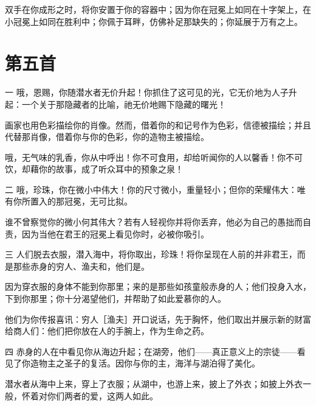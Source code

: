 双手在你成形之时，将你安置于你的容器中；因为你在冠冕上如同在十字架上，在小冠冕上如同在胜利中；你佩于耳畔，仿佛补足那缺失的；你延展于万有之上。\par


\section{第五首}

一 哦，恩赐，你随潜水者无价升起！你抓住了这可见的光，它无价地为人子升起：一个关于那隐藏者的比喻，祂无价地赐下隐藏的曙光！\par

画家也用色彩描绘你的肖像。然而，借着你的和记号作为色彩，信德被描绘；并且代替那肖像，借着你与你的色彩，你的造物主被描绘。\par

哦，无气味的乳香，你从中呼出！你不可食用，却给听闻你的人以馨香！你不可饮，却藉你的故事，成了听众耳中的预象之泉！\par

二 哦，珍珠，你在微小中伟大！你的尺寸微小，重量轻小；但你的荣耀伟大：唯有你所置入的那冠冕，无可比拟。\par

谁不曾察觉你的微小何其伟大？若有人轻视你并将你丢弃，他必为自己的愚拙而自责，因为当他在君王的冠冕上看见你时，必被你吸引。\par

三 人们脱去衣服，潜入海中，将你取出，珍珠！将你呈现在人前的并非君王，而是那些赤身的穷人、渔夫和，他们是。\par

因为穿衣服的身体不能到你那里；来的是那些如孩童般赤身的人；他们投身入水，下到你那里；你十分渴望他们，并帮助了如此爱慕你的人。\par

他们为你传报喜讯：穷人［渔夫］开口说话，先于胸怀，他们取出并展示新的财富给商人们：他们把你放在人的手腕上，作为生命之药。\par

四 赤身的人在中看见你从海边升起；在湖旁，他们——真正意义上的宗徒——看见了你造物主之圣子的复活。因你与你的主，海洋与湖泊得了美化。\par

潜水者从海中上来，穿上了衣服；从湖中，也游上来，披上了外衣；如披上外衣一般，怀着对你们两者的爱，这两人如此。\par

